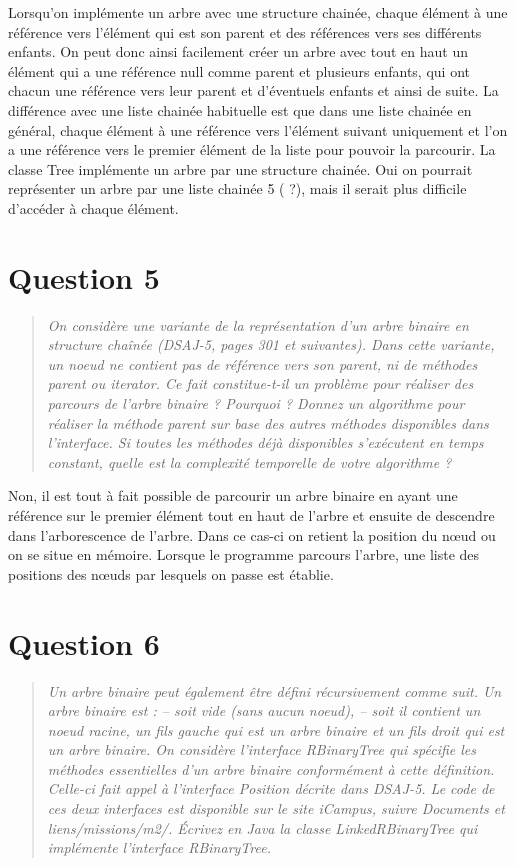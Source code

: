 \documentclass[11pt,a4paper]{article}
\begin{document}
Lorsqu’on implémente un arbre avec une structure chainée, chaque élément à une référence vers l’élément qui est son parent et des références vers ses différents enfants. On peut donc ainsi facilement créer un arbre avec tout en haut un élément qui a une référence null comme parent et plusieurs enfants, qui ont chacun une référence vers leur parent et d’éventuels enfants et ainsi de suite.
La différence avec une liste chainée habituelle est que dans une liste chainée en général, chaque élément à une référence vers l’élément suivant uniquement et l’on a une référence vers le premier élément de la liste pour pouvoir la parcourir.
La classe Tree implémente un arbre par une structure chainée. Oui on pourrait représenter un arbre par une liste chainée 5 ( ?), mais il serait plus difficile d’accéder à chaque élément.

\section{Question 5}
\begin{quotation}
\color{gray}\textit{On considère une variante de la représentation d’un arbre binaire en structure
chaînée (DSAJ-5, pages 301 et suivantes). Dans cette variante, un noeud ne contient pas de référence vers son parent, ni de méthodes parent ou iterator.
Ce fait constitue-t-il un problème pour réaliser des parcours de l’arbre binaire ?
Pourquoi ?
Donnez un algorithme pour réaliser la méthode parent sur base des autres méthodes disponibles dans l’interface. Si toutes les méthodes déjà disponibles s’exécutent en temps constant, quelle est la complexité temporelle de votre algorithme ?}
\end{quotation}

Non, il est tout à fait possible de parcourir un arbre binaire en ayant une référence sur le premier élément tout en haut de l’arbre et ensuite de descendre dans l’arborescence de l’arbre. Dans ce cas-ci on retient la position du nœud ou on se situe en mémoire. Lorsque le programme parcours l’arbre, une liste des positions des nœuds par lesquels on passe est établie.

\section{Question 6}
\begin{quotation}
\color{gray}\textit{Un arbre binaire peut également être défini récursivement comme suit. Un arbre
binaire est :
– soit vide (sans aucun noeud),
– soit il contient un noeud racine, un fils gauche qui est un arbre binaire et un fils
droit qui est un arbre binaire.
On considère l’interface RBinaryTree qui spécifie les méthodes essentielles
d’un arbre binaire conformément à cette définition. Celle-ci fait appel à l’interface
Position décrite dans DSAJ-5. Le code de ces deux interfaces est disponible
sur le site iCampus, suivre Documents et liens/missions/m2/.
Écrivez en Java la classe LinkedRBinaryTree qui implémente l’interface
RBinaryTree.}
\end{quotation}
\end{document}
